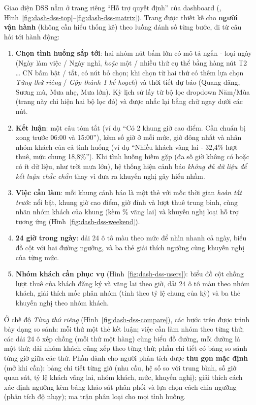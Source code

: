 \label{sec:dss-ui}
Giao diện DSS nằm ở trang riêng ``Hỗ trợ quyết định'' của dashboard (, Hình~\ref{fig:dash-dss-top}--\ref{fig:dash-dss-matrix}). Trang được thiết kế cho \textbf{người vận hành} (không cần hiểu thống kê) theo luồng đánh số từng bước, đi từ câu hỏi tới hành động:
\begin{enumerate}
    \item \textbf{Chọn tình huống sắp tới}: hai nhóm nút bấm lớn có mô tả ngắn - loại ngày (Ngày làm việc / Ngày nghỉ, \textit{hoặc} một / nhiều thứ cụ thể bằng hàng nút T2 \ldots{} CN bấm bật / tắt, có nút bỏ chọn; khi chọn từ hai thứ có thêm lựa chọn \textit{Từng thứ riêng} / \textit{Gộp thành 1 kế hoạch}) và thời tiết dự báo (Quang đãng, Sương mù, Mưa nhẹ, Mưa lớn). Kỳ lịch sử lấy từ bộ lọc dropdown Năm/Mùa (trang này chỉ hiện hai bộ lọc đó) và được nhắc lại bằng chữ ngay dưới các nút.
    \item \textbf{Kết luận}: một câu tóm tắt (ví dụ ``Có 2 khung giờ cao điểm. Cần chuẩn bị xong trước 06:00 và 15:00''), kèm số giờ ở mỗi mức, giờ đông nhất và nhãn nhóm khách của cả tình huống (ví dụ ``Nhiều khách vãng lai - 32,4\% lượt thuê, mức chung 18,8\%''). Khi tình huống hiếm gặp (đa số giờ không có hoặc có ít dữ liệu, như trời mưa lớn), hệ thống hiện cảnh báo \textit{không đủ dữ liệu để kết luận chắc chắn} thay vì đưa ra khuyến nghị gây hiểu nhầm.
    \item \textbf{Việc cần làm}: mỗi khung cảnh báo là một thẻ với mốc thời gian \textit{hoàn tất trước} nổi bật, khung giờ cao điểm, giờ đỉnh và lượt thuê trung bình, cùng nhãn nhóm khách của khung (kèm \% vãng lai) và khuyến nghị loại hỗ trợ tương ứng (Hình~\ref{fig:dash-dss-weekend}).
    \item \textbf{24 giờ trong ngày}: dải 24 ô tô màu theo mức để nhìn nhanh cả ngày, biểu đồ cột với hai đường ngưỡng, và ba thẻ giải thích ngưỡng cùng khuyến nghị của từng mức.
    \item \textbf{Nhóm khách cần phục vụ} (Hình~\ref{fig:dash-dss-users}): biểu đồ cột chồng lượt thuê của khách đăng ký và vãng lai theo giờ, dải 24 ô tô màu theo nhóm khách, giải thích mốc phân nhóm (tính theo tỷ lệ chung của kỳ) và ba thẻ khuyến nghị theo nhóm khách.
\end{enumerate}
Ở chế độ \textit{Từng thứ riêng} (Hình~\ref{fig:dash-dss-compare}), các bước trên được trình bày dạng so sánh: mỗi thứ một thẻ kết luận; việc cần làm nhóm theo từng thứ; các dải 24 ô xếp chồng (mỗi thứ một hàng) cùng biểu đồ đường, mỗi đường là một thứ; dải nhóm khách cũng xếp theo từng thứ; phần chi tiết có bảng so sánh từng giờ giữa các thứ.
Phần dành cho người phân tích được \textbf{thu gọn mặc định} (mở khi cần): bảng chi tiết từng giờ (nhu cầu, hệ số so với trung bình, số giờ quan sát, tỷ lệ khách vãng lai, nhóm khách, mức, khuyến nghị); giải thích cách xác định ngưỡng kèm bảng khảo sát phân phối và lựa chọn cách chia ngưỡng (phân tích độ nhạy); ma trận phân loại cho mọi tình huống.

